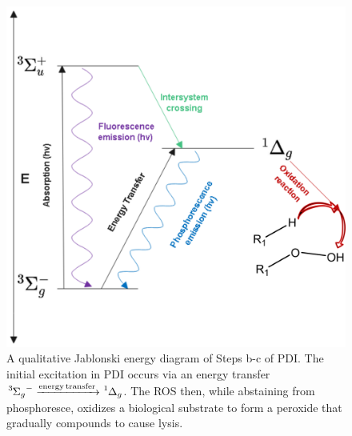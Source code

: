 \begin{figure}[t]
    \centering
    \includegraphics[width = \textwidth]{images/PDIpy/background/jablonski_diagram.png}
    \caption{
        A qualitative Jablonski energy diagram of Steps b-c of PDI. The initial excitation in PDI occurs via an energy transfer $\ce{^3\Sigma_g^- ->[energy transfer] ^1\Delta_g}$. The ROS then, while abstaining from phosphoresce, oxidizes a biological substrate to form a peroxide that gradually compounds to cause lysis.
    }
    \label{jablonski_diagram}
\end{figure}

